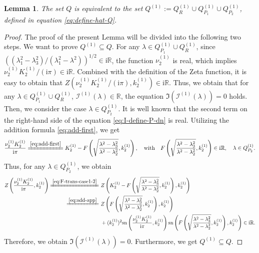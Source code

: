 \documentclass[11pt,reqno]{amsart}
\newcommand{\ii}{\mathrm{i}}
\newcommand{\sn}{\mathrm{sn}}
\newtheorem{lemma}{Lemma}
\numberwithin{equation}{section}
\begin{document}
\begin{lemma}\label{lemma:dn-bounded}
	The set $Q$ is equivalent to the set $ Q^{(1)} := Q^{(1)} _R\cup  Q^{(1)} _{P_1}\cup  Q^{(1)} _{P_2}$, defined in equation \eqref{eq:define-hat-Q}.
	
\end{lemma}
\begin{proof}
	The proof of the present Lemma will be divided into the following two steps. 
	We want to prove $ Q^{(1)} \subseteq Q$.
	For any $\lambda\in 
	 Q^{(1)} _{P_1} \cup  Q^{(1)} _{R}$, since $((\lambda_1^2-\lambda_3^2)/(\lambda_1^2-\lambda^2))^{1/2}\in \ii \mathbb{R}$, the function $ \nu^{(1)} _2$ is real, which implies $ \nu^{(1)} _2  K^{(1)}_2/(\ii \pi)\in \ii  \mathbb{R}$.
	Combined with the definition of the Zeta function, it is easy to obtain that $Z( \nu^{(1)} _2  K^{(1)}_2/(\ii \pi),  k^{(1)}_2)\in \ii \mathbb{R}$.
	Thus, we obtain that for any $\lambda\in 
	 Q^{(1)} _{P_1} \cup  Q^{(1)} _{R}$, $\mathcal{I}^{(1)}(\lambda)\in \mathbb{R}$, the equation $\Im(\mathcal{I}^{(1)}(\lambda))=0$ holds.
	Then, we consider the case $\lambda \in  Q^{(1)} _{P_2}$.
	It is well known that the second term on the right-hand side of the equation \eqref{eq:I-define-P-dn} is real.
	Utilizing the addition formula \eqref{eq:add-first}, we get
	\begin{equation}\label{eq:F-trans-case1-2}
		\frac{\nu^{(1)} _2  K^{(1)}_2}{\ii \pi}\xlongequal{\eqref{eq:add-first}}K^{(1)}_2-F\left(\sqrt{\frac{\lambda^2-\lambda_3^2}{\lambda^2-\lambda_2^2}},  k^{(1)}_2\right), \quad \text{with} \quad F\left(\sqrt{\frac{\lambda^2-\lambda_3^2}{\lambda^2-\lambda_2^2}},  k^{(1)}_2\right)\in \ii \mathbb{R}, \quad \lambda\in  Q^{(1)} _{P_2}.
	\end{equation}
	Thus, for any $\lambda\in  Q^{(1)} _{P_2}$, we obtain
	\begin{equation}\nonumber
		\begin{split}
			Z\left(\frac{ \nu^{(1)} _2  K^{(1)}_2}{\ii \pi},  k^{(1)}_2\right)\xlongequal{\eqref{eq:F-trans-case1-2}} &\ Z \left(K^{(1)}_2-F\left(\sqrt{\frac{\lambda^2-\lambda_3^2}{\lambda^2-\lambda_2^2}},  k^{(1)}_2\right),  k^{(1)}_2\right) \\
			\xlongequal{\eqref{eq:add-app}}&\ Z\left( F\left(\sqrt{\frac{\lambda^2-\lambda_3^2}{\lambda^2-\lambda_2^2}},  k^{(1)}_2\right),k^{(1)}_2\right)\\
			&\ +  (k^{(1)}_2)^2\sn\left(\frac{ \nu^{(1)} _2  K^{(1)}_2}{\ii \pi},  k^{(1)}_2\right)\sn\left( F\left(\sqrt{\frac{\lambda^2-\lambda_3^2}{\lambda^2-\lambda_2^2}},  k^{(1)}_2\right),  k^{(1)}_2\right)\in \ii \mathbb{R}.
		\end{split}
	\end{equation}
	Therefore, we obtain $\Im(\mathcal{I}^{(1)}(\lambda))=0$. Furthermore, we get $ Q^{(1)} \subseteq Q$.


\end{proof}
\end{document}

